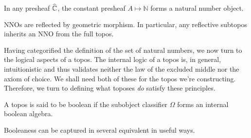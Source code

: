 \begin{example}
  In any presheaf $\widehat{\mathbb{C}}$, the constant presheaf $A \mapsto
  \mathbb{N}$ forms a natural number object.
\end{example}

\begin{example}
  NNOs are reflected by geometric morphism. In particular, any
  reflective subtopos inherits an NNO from the full topos.
\end{example}

Having categorified the definition of the set of natural numbers, we
now turn to the logical aspects of a topos. The internal logic of a
topos is, in general, intuitionistic and thus validates neither the
law of the excluded middle nor the axiom of choice. We shall need both
of these for the topos we're constructing. Therefore, we turn to
defining what toposes \emph{do} satisfy these principles.

\begin{defn}\label{defn:background:boolean}
  A topos is said to be boolean if the subobject classifier $\Omega$
  forms an internal boolean algebra.
\end{defn}

Booleaness can be captured in several equivalent in useful ways.

